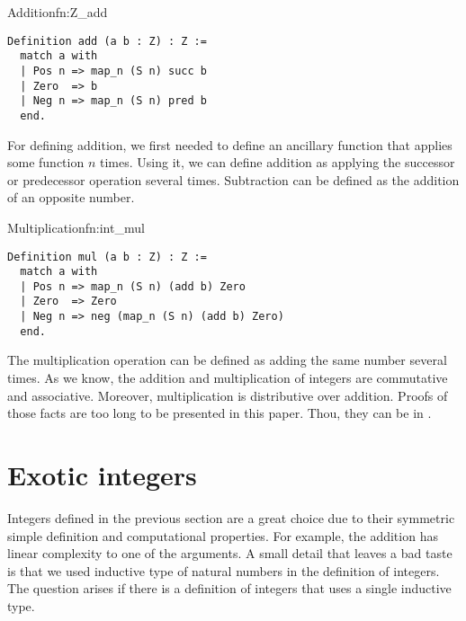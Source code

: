 \begin{func}{Addition}{fn:Z_add}
\begin{verbatim}
Definition add (a b : Z) : Z :=
  match a with 
  | Pos n => map_n (S n) succ b
  | Zero  => b
  | Neg n => map_n (S n) pred b
  end.
\end{verbatim}
\end{func}
For defining addition, we first needed to define an ancillary function that applies some function $n$ times. Using it, we can define addition as applying the successor or predecessor operation several times. Subtraction can be defined as the addition of an opposite number.
\begin{func}{Multiplication}{fn:int_mul}
\begin{verbatim}
Definition mul (a b : Z) : Z :=
  match a with 
  | Pos n => map_n (S n) (add b) Zero
  | Zero  => Zero
  | Neg n => neg (map_n (S n) (add b) Zero)
  end.
\end{verbatim}
\end{func}
The multiplication operation can be defined as adding the same number several times. As we know, the addition and multiplication of integers are commutative and associative. Moreover, multiplication is distributive over addition. Proofs of those facts are too long to be presented in this paper. Thou, they can be in .
\section{Exotic integers}
Integers defined in the previous section are a great choice due to their symmetric simple definition and computational properties. For example, the addition has linear complexity to one of the arguments. A small detail that leaves a bad taste is that we used inductive type of natural numbers in the definition of integers. The question arises if there is a definition of integers that uses a single inductive type.

